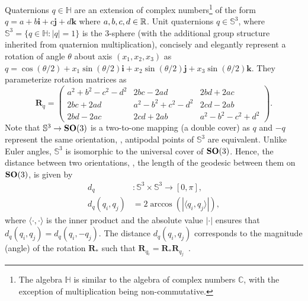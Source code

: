 Quaternions $q \in \mathbb{H}$ are an extension of complex numbers\footnote{The algebra $\mathbb{H}$ is similar to the algebra of complex numbers $\mathbb{C}$, with the exception of multiplication being non-commutative.} of the form $q = a + b\boldsymbol{i} + c\boldsymbol{j} + d\boldsymbol{k}$ where $a,b,c,d \in \mathbb{R}$.
Unit quaternions $q \in \mathbb{S}^3$, where $\mathbb{S}^3 = \big\{ q \in \mathbb{H}: \lvert q \rvert = 1 \big\}$ is the 3-sphere (with the additional group structure inherited from quaternion multiplication), concisely and elegantly represent a rotation of angle $\theta$ about axis $(x_1, x_2, x_3)$ as $q = \cos(\theta/2) + x_1 \sin(\theta/2) \boldsymbol{i} + x_2 \sin(\theta/2) \boldsymbol{j} + x_3 \sin(\theta/2) \boldsymbol{k}$.
They parameterize rotation matrices as
\begin{equation*}
    \mathbf{R}_q =
    \begin{pmatrix}
        a^2+b^2-c^2-d^2 & 2bc-2ad & 2bd+2ac \\
        2bc+2ad & a^2-b^2+c^2-d^2 & 2cd-2ab \\
        2bd-2ac & 2cd+2ab & a^2-b^2-c^2+d^2
    \end{pmatrix}.
\end{equation*}
Note that $\mathbb{S}^3 \rightarrow \mathrm{\mathbf{SO}}(3)$ is a two-to-one mapping (a double cover) as $q$ and $-q$ represent the same orientation, \ie, antipodal points of $\mathbb{S}^3$ are equivalent.
Unlike Euler angles, $\mathbb{S}^3$ is isomorphic to the universal cover of $\mathrm{\mathbf{SO}}(3)$.
Hence, the distance between two orientations, \ie, the length of the geodesic between them on $\mathrm{\mathbf{SO}}(3)$, is given by
\begin{equation}
    \begin{aligned}
        d_q &: \mathbb{S}^3 \times \mathbb{S}^3 \rightarrow [0,\pi], \\
        d_q(q_i, q_j) &= 2 \arccos \left( \left| \langle q_i, q_j \rangle \right| \right),
    \label{eqn:distance:orientations}
    \end{aligned}
\end{equation}
where $\langle \cdot, \cdot \rangle$ is the inner product and the absolute value $\left| \cdot \right|$ ensures that $d_q(q_i, q_j) = d_q(q_i, -q_j)$.
The distance $d_q(q_i, q_j)$ corresponds to the magnitude (angle) of the rotation $\mathbf{R}_*$ such that $\mathbf{R}_{q_i} = \mathbf{R}_* \mathbf{R}_{q_j}$~\cite{huynh2009metrics}.

